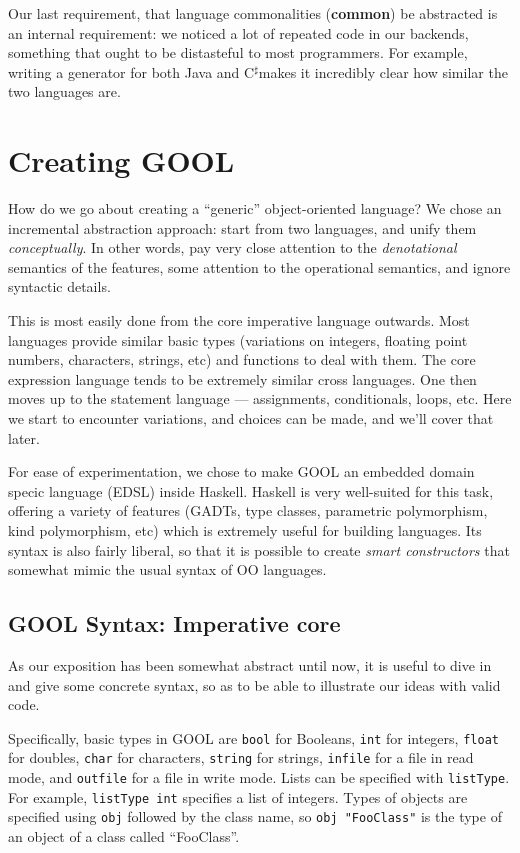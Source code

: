 \documentclass[sigplan,review,anonymous,prologue,dvipsnames]{acmart}
\newcommand{\Csharp}{C$^{\sharp}$}
\newcommand{\abbrev}[1]{\textbf{#1}}
\newcommand{\common}{\abbrev{common}}
\begin{document}
Our last requirement, that language commonalities (\common) be abstracted is
an internal requirement: we noticed a lot of repeated code in our backends,
something that ought to be distasteful to most programmers. For example, writing
a generator for both Java and \Csharp makes it incredibly clear how similar the two
languages are.

\section{Creating GOOL} \label{sec:creating}

How do we go about creating a ``generic'' object-oriented language?
We chose an incremental abstraction approach: start from two languages,
and unify them \emph{conceptually}.  In other words, pay very close
attention to the \emph{denotational} semantics of the features, some
attention to the operational semantics, and ignore syntactic details.

This is most easily done from the core imperative language outwards.
Most languages provide similar basic types (variations on integers,
floating point numbers, characters, strings, etc) and functions to deal
with them. The core expression language tends to be extremely similar
cross languages. One then moves up to the statement language ---
assignments, conditionals, loops, etc.  Here we start to encounter
variations, and choices can be made, and we'll cover that later.

For ease of experimentation, we chose to make GOOL an embedded
domain specic language (EDSL) inside Haskell.  Haskell is very well-suited
for this task, offering a variety of features (GADTs, type classes,
parametric polymorphism, kind polymorphism, etc) which is extremely useful
for building languages.  Its syntax is also fairly liberal, so that it is
possible to create \emph{smart constructors} that somewhat mimic the
usual syntax of OO languages.

\subsection{GOOL Syntax: Imperative core} \label{ssec:syntax}

As our exposition has been somewhat abstract until now, it is useful to
dive in and give some concrete syntax, so as to be able to illustrate
our ideas with valid code.

Specifically, basic types in GOOL are \verb|bool| for Booleans,
\verb|int| for integers, \verb|float| for doubles, \verb|char|
for characters, \verb|string| for strings, \verb|infile| for a file
in read mode, and \verb|outfile| for a file in write mode. Lists can be
specified with \verb|listType|. For example, \verb|listType int|
specifies a list of integers. Types of objects are specified using
\verb|obj| followed by the class name, so \verb|obj "FooClass"| is the type of
an object of a class called ``FooClass''.
\end{document}
